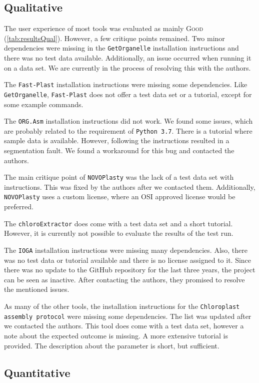 \documentclass{bmcart}
\newcommand{\formatprogramnames}[1]{\texttt{#1}}
\newcommand{\ce}{\formatprogramnames{chloroExtractor}}
\newcommand{\oa}{\formatprogramnames{ORG.Asm}}
\newcommand{\fp}{\formatprogramnames{Fast-Plast}}
\newcommand{\ioga}{\formatprogramnames{IOGA}}
\newcommand{\np}{\formatprogramnames{NOVOPlasty}}
\newcommand{\go}{\formatprogramnames{GetOrganelle}}
\newcommand{\cassp}{\formatprogramnames{Chloroplast assembly protocol}}
\newcommand{\good}{\textsc{Good}}
\begin{document}
\subsection*{Qualitative}
The user experience of most tools was evaluated as mainly \good{} (\cref{tab:resultsQual}). However, a few critique points remained.
Two minor dependencies were missing in the \go{} installation instructions and there was no test data available.
Additionally, an issue occurred when running it on a  data set.
We are currently in the process of resolving this with the authors.

The \fp{} installation instructions were missing some dependencies.
Like \go{}, \fp{} does not offer a test data set or a tutorial, except for some example commands. 

The \oa{} installation instructions did not work.
We found some issues, which are probably related to the requirement of \texttt{Python~3.7}.
There is a tutorial where sample data is available.
However, following the instructions resulted in a segmentation fault.
We found a workaround for this bug and contacted the authors.

The main critique point of \np{} was the lack of a test data set with instructions.
This was fixed by the authors after we contacted them.
Additionally, \np{} uses a custom license, where an OSI approved license would be preferred.

The \ce{} does come with a test data set and a short tutorial.
However, it is currently not possible to evaluate the results of the test run.

The \ioga{} installation instructions were missing many dependencies.
Also, there was no test data or tutorial available and there is no license assigned to it.
Since there was no update to the GitHub repository for the last three years, the project can be seen as inactive.
After contacting the authors, they promised to resolve the mentioned issues.

As many of the other tools, the installation instructions for the \cassp{} were missing some dependencies.
The list was updated after we contacted the authors.
This tool does come with a test data set, however a note about the expected outcome is missing.
A more extensive tutorial is provided.
The description about the parameter is short, but sufficient.

\subsection*{Quantitative}
\end{document}
